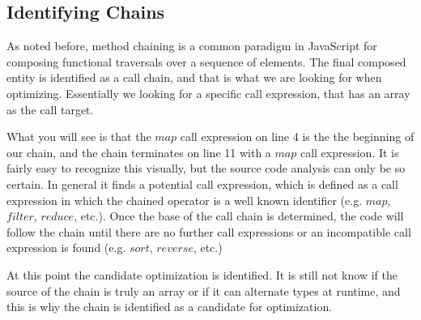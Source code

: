 \subsection{Identifying Chains}

As noted before, method chaining is a common paradigm in JavaScript for composing functional traversals over a sequence of elements.  The final composed entity is identified as a call chain, and that is what we are looking for when optimizing.  Essentially we looking for a specific call expression, that has an array as the call target. \\

\begin{minipage}{\linewidth}

\end{minipage}

What you will see is that the $map$ call expression on line 4 is the the beginning of our chain, and the chain terminates on line 11 with a $map$ call expression.  It is fairly easy to recognize this visually, but the source code analysis can only be so certain.  In general it finds a potential call expression, which is defined as a call expression in which the chained operator is a well known identifier (e.g. $map$, $filter$, $reduce$, etc.). Once the base of the call chain is determined, the code will follow the chain until there are no further call expressions or an incompatible call expression is found (e.g. $sort$, $reverse$, etc.)

At this point the candidate optimization is identified.  It is still not know if the source of the chain is truly an array or if it can alternate types at runtime, and this is why the chain is identified as a candidate for optimization. 